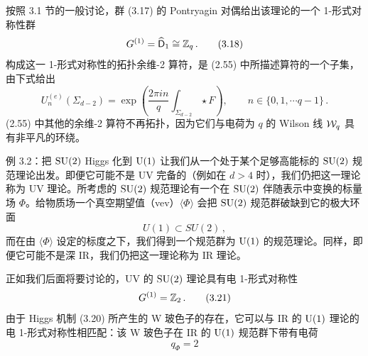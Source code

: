  按照 3.1 节的一般讨论，群 (3.17) 的 Pontryagin 对偶给出该理论的一个 1-形式对称性群
\begin{equation}
  G^{(1)}=\widehat{\mathsf{D}}_1\cong\mathbb{Z}_q\,. \tag{3.18}
\end{equation}
构成这一 1-形式对称性的拓扑余维-2 算符，是 (2.55) 中所描述算符的一个子集，由下式给出
\begin{equation}
  U_n^{(e)}(\Sigma_{d-2})=\exp\!\left(\frac{2\pi i n}{q}\int_{\Sigma_{d-2}}\star F\right),\qquad n\in\{0,1,\cdots q-1\}\,. \tag{3.19}
\end{equation}
(2.55) 中其他的余维-2 算符不再拓扑，因为它们与电荷为 $q$ 的 Wilson 线 $\mathcal{W}_q$ 具有非平凡的环绕。



\begin{examplebox}{例 3.2：把 $\mathrm{SU}(2)$ Higgs 化到 $\mathrm{U}(1)$}
让我们从一个处于某个足够高能标的 $\mathrm{SU}(2)$ 规范理论出发。即便它可能不是 UV 完备的（例如在 $d>4$ 时），我们仍把这一理论称为 UV 理论。所考虑的 $\mathrm{SU}(2)$ 规范理论有一个在 $\mathrm{SU}(2)$ 伴随表示中变换的标量场 $\Phi$。给物质场一个真空期望值（vev）$\langle\Phi\rangle$ 会把 $\mathrm{SU}(2)$ 规范群破缺到它的极大环面
\begin{equation}
  U(1)\subset SU(2)\,, \tag{3.20}
\end{equation}
而在由 $\langle\Phi\rangle$ 设定的标度之下，我们得到一个规范群为 $\mathrm{U}(1)$ 的规范理论。同样，即便它可能不是深 IR，我们仍把这一理论称为 IR 理论。

正如我们后面将要讨论的，UV 的 $\mathrm{SU}(2)$ 理论具有电 1-形式对称性
\begin{equation}
  G^{(1)}=\mathbb{Z}_2\,. \tag{3.21}
\end{equation}
由于 Higgs 机制 (3.20) 所产生的 W 玻色子的存在，它可以与 IR 的 $\mathrm{U}(1)$ 理论的电 1-形式对称性相匹配：该 W 玻色子在 IR 的 $\mathrm{U}(1)$ 规范群下带有电荷
\begin{equation}
  q_\Phi=2 \tag{3.22}
\end{equation}
\end{examplebox}

